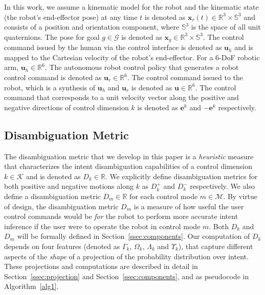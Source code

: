 \documentclass[journal]{IEEEtran}
\begin{document}
In this work, we assume a kinematic model for the robot and the kinematic state (the robot's end-effector pose) at any time $t$ is denoted as $\boldsymbol{x}_r(t) \in \mathbb{R}^3 \times \mathbb{S}^3$ and consists of a position and orientation component, where $\mathbb{S}^3$ is the space of all unit quaternions. The pose for goal $g \in \mathcal{G}$ is denoted as $\boldsymbol{x}_g \in \mathbb{R}^3 \times \mathbb{S}^3$. The control command issued by the human via the control interface is denoted as $\boldsymbol{u}_h$ and is mapped to the Cartesian velocity of the robot's end-effector. For a 6-DoF robotic arm, $\boldsymbol{u}_h \in \mathbb{R}^6$. The autonomous robot control policy that generates a robot control command is denoted as $\boldsymbol{u}_r \in \mathbb{R}^6$. The control command issued to the robot, which is a synthesis of $\boldsymbol{u}_h$ and $\boldsymbol{u}_r$ is denoted as $\boldsymbol{u} \in \mathbb{R}^6$. The control command that corresponds to a unit velocity vector along the positive and negative directions of control dimension $k$ is denoted as $\boldsymbol{e}^k$ and $-\boldsymbol{e}^k$ respectively.

\subsection{Disambiguation Metric}\label{ssec:disamb}
The disambiguation metric that we develop in this paper is a \textit{heuristic} measure that characterizes the intent disambiguation capabilities of a control dimension $k \in \mathcal{K}$ and is denoted as $D_k \in \mathbb{R}$. We explicitly define disambiguation metrics for both positive and negative motions along $k$ as $D_k^{+}$ and $D_k^{-}$ respectively. We also define a disambiguation metric $D_m \in \mathbb{R}$ for each control mode $m \in \mathcal{M}$.
By virtue of design, the disambiguation metric $D_m$ is a measure of how useful the user control commands would be \textit{for} the robot to perform more accurate intent inference if the user were to operate the robot in control mode $m$. Both $D_k$ and $D_m$ will be formally defined in Section~\ref{ssec:components}. 
Our computation of $D_k$ depends on four features (denoted as $\Gamma_k$, $\Omega_k$, $\Lambda_k$ and $\Upsilon_k$), that capture different aspects of the \textit{shape} of a projection of the probability distribution over intent. These projections and computations are described in detail in Section~\ref{ssec:projection} and Section~\ref{ssec:components}, and as pseudocode in Algorithm~\ref{alg1}. 
\end{document}
